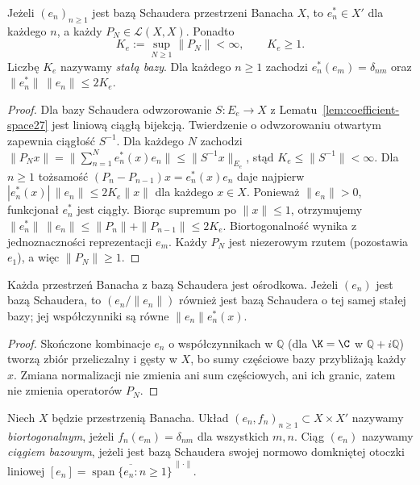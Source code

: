 \begin{twierdzenie}
\label{thm:basis-continuity27}
Jeżeli $(e_n)_{n\ge1}$ jest bazą Schaudera przestrzeni
Banacha $X$, to $e_n^*\in X'$ dla każdego $n$, a każdy
$P_N\in\mathcal L(X,X)$. Ponadto
\[
K_e:=\sup_{N\ge1}\|P_N\|<\infty,\qquad K_e\ge1.
\]
Liczbę $K_e$ nazywamy \emph{stałą bazy}.
Dla każdego $n\ge1$ zachodzi $e_n^*(e_m)=\delta_{nm}$
oraz $\|e_n^*\|\,\|e_n\|\le2K_e$.
\end{twierdzenie}
\begin{proof}
Dla bazy Schaudera odwzorowanie $S:E_e\to X$
z Lematu~\ref{lem:coefficient-space27} jest liniową ciągłą
bijekcją. Twierdzenie o odwzorowaniu otwartym zapewnia
ciągłość $S^{-1}$. Dla każdego $N$ zachodzi
$\|P_Nx\|=\|\sum_{n=1}^Ne_n^*(x)e_n\|
\le\|S^{-1}x\|_{E_e}$,
stąd $K_e\le\|S^{-1}\|<\infty$.
Dla $n\ge1$ tożsamość
$(P_n-P_{n-1})x=e_n^*(x)e_n$ daje najpierw
$|e_n^*(x)|\,\|e_n\|\le2K_e\|x\|$ dla każdego $x\in X$.
Ponieważ $\|e_n\|>0$, funkcjonał $e_n^*$ jest ciągły.
Biorąc supremum po $\|x\|\le1$, otrzymujemy
$\|e_n^*\|\,\|e_n\|\le\|P_n\|+\|P_{n-1}\|\le2K_e$.
Biortogonalność wynika z jednoznaczności reprezentacji $e_m$.
Każdy $P_N$ jest niezerowym rzutem (pozostawia $e_1$),
a więc $\|P_N\|\ge1$.
\end{proof}

\begin{wniosek}
\label{cor:separable27}
Każda przestrzeń Banacha z bazą Schaudera jest ośrodkowa.
Jeżeli $(e_n)$ jest bazą Schaudera, to
$(e_n/\|e_n\|)$ również jest bazą Schaudera o tej samej stałej
bazy; jej współczynniki są równe $\|e_n\|e_n^*(x)$.
\end{wniosek}
\begin{proof}
Skończone kombinacje $e_n$ o współczynnikach w $\mathbb Q$
(dla $\K=\C$ w $\mathbb Q+i\mathbb Q$) tworzą zbiór przeliczalny
i gęsty w $X$, bo sumy częściowe bazy przybliżają każdy $x$.
Zmiana normalizacji nie zmienia ani sum częściowych,
ani ich granic, zatem nie zmienia operatorów $P_N$.
\end{proof}

\begin{definicja}
\label{def:biorthogonal27}
Niech $X$ będzie przestrzenią Banacha.
Układ $(e_n,f_n)_{n\ge1}\subset X\times X'$ nazywamy
\emph{biortogonalnym}, jeżeli $f_n(e_m)=\delta_{nm}$
dla wszystkich $m,n$. Ciąg $(e_n)$ nazywamy
\emph{ciągiem bazowym}, jeżeli jest bazą Schaudera swojej
normowo domkniętej otoczki liniowej $[e_n]
=\overline{\operatorname{span}\{e_n:n\ge1\}}^{\,\|\cdot\|}$.
\end{definicja}

